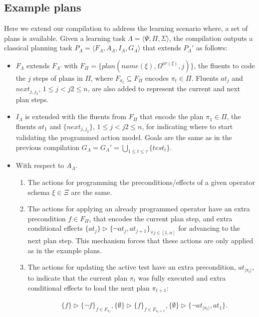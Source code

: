 \documentclass[letterpaper]{article} %
\newcommand{\tup}[1]{{\langle #1 \rangle}}
\begin{document}
\subsection{Example plans}
Here  we extend our compilation to address the learning scenario where, a set of plans is available. Given a learning task $\Lambda=\tup{\Psi,\Pi,\Sigma}$, the compilation outputs a classical planning task $P_{\Lambda}=\tup{F_{\Lambda},A_{\Lambda},I_{\Lambda},G_{\Lambda}}$ that extends $P_{\Lambda}'$ as follows:
\begin{itemize}
\item $F_{\Lambda}$ extends $F_{\Lambda'}$ with $F_{\Pi}=\{plan(name(\xi),\Omega^{ar(\xi)},j)\}$, the fluents to code the $j$ steps of plans in $\Pi$, where $F_{\pi_t}\subseteq F_{\Pi}$ encodes $\pi_t\in \Pi$. Fluents $at_j$ and $next_{j,j_2}$, {\small $1\leq j<j2\leq n$}, are also added to represent the current and next plan steps.
\item $I_{\Lambda}$ is extended with the fluents from $F_{\Pi}$ that encode the plan $\pi_1\in \Pi$, the fluents $at_1$ and $\{next_{j,j_2}\}$, {\small $1\leq j<j2\leq n$}, for indicating where to start validating the programmed action model. Goals are the same as in the previous compilation $G_{\Lambda}=G_{\Lambda}'=\bigcup_{1\leq t\leq \tau}\{test_t\}$.
\item With respect to $A_{\Lambda}$.
\begin{enumerate}
\item The actions for programming the preconditions/effects of a given operator schema $\xi\in\Xi$ are the same.
\item The actions for applying an already programmed operator have an extra precondition $f\in F_{\Pi}$, that encodes the current plan step, and extra conditional effects $\{at_{j}\}\rhd\{\neg at_{j},at_{j+1}\}_{\forall j\in [1,n]}$ for advancing to the next plan step. This mechanism forces that these actions are only applied as in the example plans.
\item The actions for updating the active test have an extra precondition, $at_{|\pi_t|}$, to indicate that the current plan $\pi_t$ was fully executed and extra conditional effects to load the next plan $\pi_{t+1}$:
\begin{small}
\begin{align*}
&\{f\}\rhd\{\neg f\}_{f\in F_{\pi_t}}, \{\emptyset\}\rhd\{f\}_{f\in F_{\pi_t+1}},\{\emptyset\}\rhd\{\neg at_{|\pi_t|},at_1\}.
\end{align*}
\end{small}
\end{enumerate}
\end{itemize}
\end{document}
